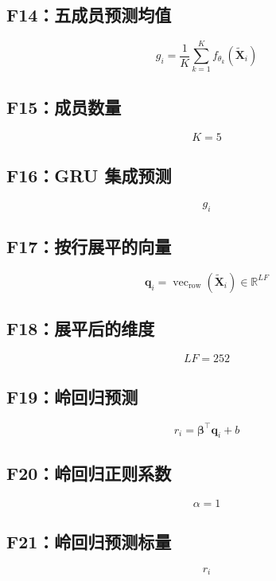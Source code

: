 \documentclass[UTF8,a4paper,11pt]{ctexart}
\begin{document}
\subsection*{F14：五成员预测均值}
\[
g_i=\frac{1}{K}\sum_{k=1}^{K} f_{\theta_k}(\widetilde{\mathbf{X}}_i)
\]

\subsection*{F15：成员数量}
\[
K=5
\]

\subsection*{F16：GRU 集成预测}
\[
g_i
\]

\subsection*{F17：按行展平的向量}
\[
\mathbf{q}_i=\operatorname{vec}_{\mathrm{row}} (\widetilde{\mathbf{X}}_i)\in\mathbb{R}^{LF}
\]

\subsection*{F18：展平后的维度}
\[
LF=252
\]

\subsection*{F19：岭回归预测}
\[
r_i=\boldsymbol{\beta}^{\top}\mathbf{q}_i+b
\]

\subsection*{F20：岭回归正则系数}
\[
\alpha=1
\]

\subsection*{F21：岭回归预测标量}
\[
r_i
\]
\end{document}
